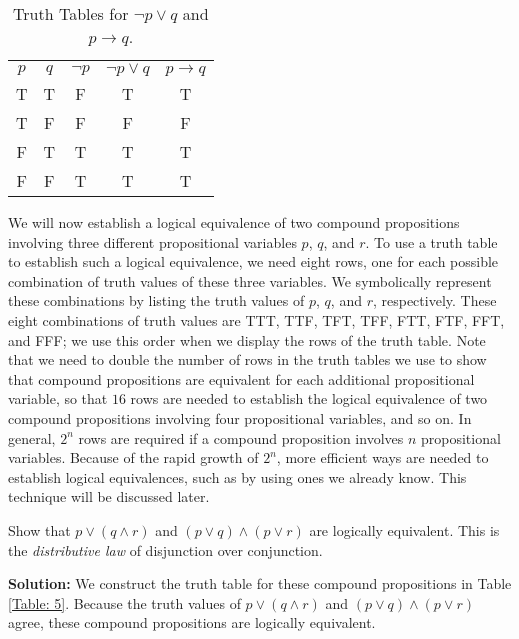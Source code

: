 \documentclass{Axon}
\begin{document}
\begin{table}[h]
    \centering
    \begin{tabular}{cc|c|c|c}
        \(p\) & \(q\) & \(\lnot p\) & \(\lnot p \lor q\) & \(p \to q\) \\
        T     & T     & F           & T                  & T           \\
        T     & F     & F           & F                  & F           \\
        F     & T     & T           & T                  & T           \\
        F     & F     & T           & T                  & T
    \end{tabular}
    \caption{Truth Tables for \(\lnot p \lor q\) and \(p \to q\).}
    \label{Table: 4}
\end{table}

We will now establish a logical equivalence of two compound propositions involving three different propositional variables \(p\), \(q\), and \(r\). To use a truth table to establish such a logical equivalence, we need eight rows, one for each possible combination of truth values of these three variables. We symbolically represent these combinations by listing the truth values of \(p\), \(q\), and \(r\), respectively. These eight combinations of truth values are TTT, TTF, TFT, TFF, FTT, FTF, FFT, and FFF; we use this order when we display the rows of the truth table. Note that we need to double the number of rows in the truth tables we use to show that compound propositions are equivalent for each additional propositional variable, so that \(16\) rows are needed to establish the logical equivalence of two compound propositions involving four propositional variables, and so on. In general, \(2^n\) rows are required if a compound proposition involves \(n\) propositional variables. Because of the rapid growth of \(2^n\), more efficient ways are needed to establish logical equivalences, such as by using ones we already know. This technique will be discussed later.

\begin{example}
    Show that \(p \lor (q \land r)\) and \((p \lor q) \land (p \lor r)\) are logically equivalent. This is the \textit{distributive law} of disjunction over conjunction.

    \noindent
    \textbf{Solution:}
    We construct the truth table for these compound propositions in Table \ref{Table: 5}. Because the truth values of \(p \lor (q \land r)\) and \((p \lor q) \land (p \lor r)\) agree, these compound propositions are logically equivalent.
\end{example}
\end{document}
